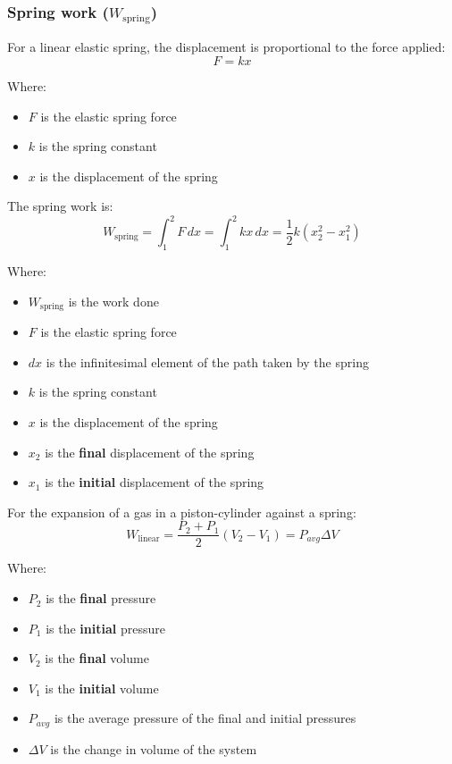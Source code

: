 \documentclass[11pt]{article}
\begin{document}
\newpage

\subsubsection{Spring work (\(W_{\text{spring}}\))}
\label{sec:orgc5b5423}
For a linear elastic spring, the displacement is proportional to the force applied:
\[F = kx\]

Where:
\begin{itemize}
\item \(F\) is the elastic spring force
\item \(k\) is the spring constant
\item \(x\) is the displacement of the spring
\end{itemize}

The spring work is:
\[W_{\text{spring}} = \int_1^2 F \, dx = \int_1^2 kx \, dx = \frac{1}{2}k \left(x_2^2 - x_1^2 \right)\]

Where:
\begin{itemize}
\item \(W_{\text{spring}}\) is the work done
\item \(F\) is the elastic spring force
\item \(dx\) is the infinitesimal element of the path taken by the spring
\item \(k\) is the spring constant
\item \(x\) is the displacement of the spring
\item \(x_2\) is the \textbf{final} displacement of the spring
\item \(x_1\) is the \textbf{initial} displacement of the spring
\end{itemize}

For the expansion of a gas in a piston-cylinder against a spring:
\[W_{\text{linear}} = \frac{P_2 + P_1}{2} \left(V_2 - V_1 \right) = P_{avg} \Delta V\]

Where:
\begin{itemize}
\item \(P_2\) is the \textbf{final} pressure
\item \(P_1\) is the \textbf{initial} pressure
\item \(V_2\) is the \textbf{final} volume
\item \(V_1\) is the \textbf{initial} volume
\item \(P_{avg}\) is the average pressure of the final and initial pressures
\item \(\Delta V\) is the change in volume of the system
\end{itemize}
\end{document}
